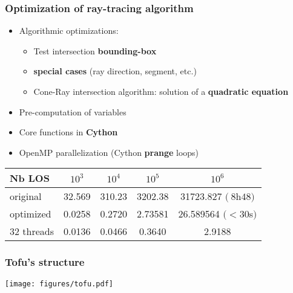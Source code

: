 \documentclass[10pt]{beamer}
\begin{document}
\begin{frame}
\frametitle{Optimization of ray-tracing algorithm}


	\begin{itemize}
	\item Algorithmic optimizations:
	\begin{itemize}
		\item Test intersection \textbf{bounding-box}
		\item \textbf{special cases} (ray direction, segment, etc.)
		\item Cone-Ray intersection algorithm: solution of a\textbf{ quadratic equation}
	\end{itemize}
	\item Pre-computation of variables
	\item Core functions in \textbf{Cython}
	\item OpenMP parallelization (Cython \textbf{prange} loops)
	\end{itemize}
\pause
\begin{table}[h] %
    \centering
    \label{tab:LOS_init_sirrah}
     \begin{tabular}{@{}l*{4}{S[table-format=1.2e-1,scientific-notation=true]}@{}}
       \toprule
       \textbf{Nb LOS} &  {$10^3$} & {$10^4$} & {$10^5$} & {$10^6$}\\
       \midrule
       original       & 32.569 & 310.23 & 3202.38 & 31723.827 $(~8$h$48)$\\
       optimized   & 0.0258 & 0.2720 & 2.73581 & 26.589564 $(<30$s$)$\\
       32 threads & 0.0136 & 0.0466 & 0.3640 & 2.9188 \\
       \bottomrule
     \end{tabular}
\end{table}
\end{frame}


\begin{frame}
\frametitle{Tofu's structure}

\begin{center}
	\texttt{[image: figures/tofu.pdf]}
\end{center}

\end{frame}
\end{document}
